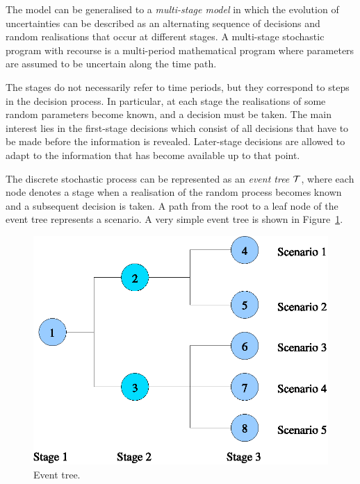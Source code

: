 
The model can be generalised to a {\em multi-stage model} in which 
the evolution of uncertainties can be 
described as an alternating sequence of decisions and random 
realisations that occur at different stages.
A multi-stage stochastic program with recourse is a multi-period 
mathematical program where parameters are assumed to be uncertain 
along the time path.

The stages do not necessarily refer to time periods, but they correspond
to steps in the decision process. In particular, at each stage the
realisations of some random parameters become known, and a decision
must be taken.
The main interest lies in the 
first-stage decisions which consist of all decisions that have to
be made before the information is revealed. Later-stage decisions 
are allowed to adapt to the information that has become available 
up to that point.

The discrete stochastic process can be represented as an 
{\em event tree} $\mathcal{T}$,
where each node denotes a stage when a realisation 
of the random process becomes known and a subsequent decision is taken.
A path from the root to a leaf node of the event tree represents a 
scenario.
A very simple event tree is shown in Figure~\ref{fig:EventTree}.
%
\begin{figure}[ht]
  \begin{center}
    \includegraphics[scale=0.6]{figures/tree.eps}
    \caption{Event tree.}
    \label{fig:EventTree}
  \end{center}
  \vspace{-3ex}
\end{figure}

